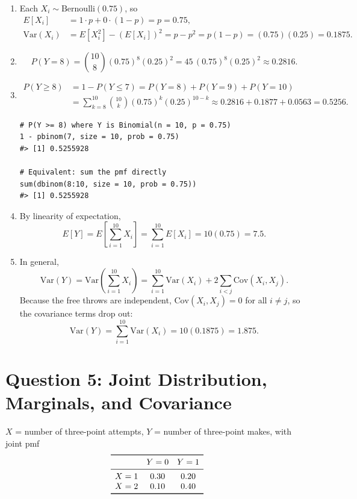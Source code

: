 \documentclass[11pt]{article}
\begin{document}
\begin{enumerate}
\item Each $X_i \sim \text{Bernoulli}(0.75)$, so
\[
\begin{aligned}
E[X_i] &= 1 \cdot p + 0 \cdot (1-p) = p = 0.75, \\
\text{Var}(X_i) &= E[X_i^2] - (E[X_i])^2 = p - p^2 = p(1-p) = (0.75)(0.25) = 0.1875.
\end{aligned}
\]

\item
\[
P(Y = 8) = \binom{10}{8}(0.75)^8(0.25)^2 = 45\,(0.75)^8(0.25)^2 \approx 0.2816.
\]

\item
\[
\begin{aligned}
P(Y \geq 8) &= 1 - P(Y \leq 7) = P(Y=8) + P(Y=9) + P(Y=10) \\
&= \sum_{k=8}^{10}\binom{10}{k}(0.75)^k(0.25)^{10-k} \approx 0.2816 + 0.1877 + 0.0563 = 0.5256.
\end{aligned}
\]
\begin{lstlisting}
# P(Y >= 8) where Y is Binomial(n = 10, p = 0.75)
1 - pbinom(7, size = 10, prob = 0.75)
#> [1] 0.5255928

# Equivalent: sum the pmf directly
sum(dbinom(8:10, size = 10, prob = 0.75))
#> [1] 0.5255928
\end{lstlisting}

\item By linearity of expectation,
\[
E[Y] = E\!\left[\sum_{i=1}^{10} X_i\right] = \sum_{i=1}^{10} E[X_i] = 10(0.75) = 7.5.
\]

\item In general,
\[
\text{Var}(Y) = \text{Var}\!\left(\sum_{i=1}^{10} X_i\right) = \sum_{i=1}^{10}\text{Var}(X_i) + 2\sum_{i<j}\text{Cov}(X_i, X_j).
\]
Because the free throws are independent, $\text{Cov}(X_i, X_j) = 0$ for all $i \neq j$, so the covariance terms drop out:
\[
\text{Var}(Y) = \sum_{i=1}^{10}\text{Var}(X_i) = 10(0.1875) = 1.875.
\]
\end{enumerate}

\section*{Question 5: Joint Distribution, Marginals, and Covariance}

$X$ = number of three-point attempts, $Y$ = number of three-point makes, with joint pmf
\[
\begin{array}{lcc}
\toprule
 & Y = 0 & Y = 1 \\
\midrule
X = 1 & 0.30 & 0.20 \\
X = 2 & 0.10 & 0.40 \\
\bottomrule
\end{array}
\]
\end{document}
